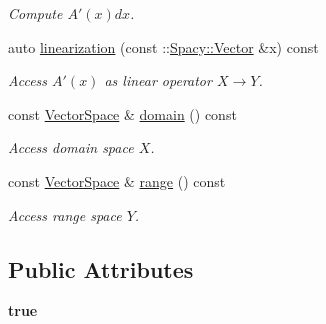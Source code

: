 \begin{DoxyCompactItemize}
\begin{DoxyCompactList}\small\item\em \-Compute $A'(x)dx$. \end{DoxyCompactList}\item 
auto \hyperlink{classSpacy_1_1dealII_1_1C1FunGOperator_3_01FunGOperator_00_01dim_00_01VariableDim_3_01variable__dims_8_8_8_4_01_4_a23e60fc5f8c950b68eaafd728dd8f118}{linearization} (const \-::\hyperlink{classSpacy_1_1Vector}{\-Spacy\-::\-Vector} \&x) const 
\begin{DoxyCompactList}\small\item\em \-Access $A'(x)$ as linear operator $X\rightarrow Y$. \end{DoxyCompactList}\item 
\hypertarget{classSpacy_1_1OperatorBase_a2588f9b3e0188820c4c494e63293dc6f}{const \hyperlink{classSpacy_1_1VectorSpace}{\-Vector\-Space} \& \hyperlink{classSpacy_1_1OperatorBase_a2588f9b3e0188820c4c494e63293dc6f}{domain} () const }\label{classSpacy_1_1OperatorBase_a2588f9b3e0188820c4c494e63293dc6f}

\begin{DoxyCompactList}\small\item\em \-Access domain space $X$. \end{DoxyCompactList}\item 
\hypertarget{classSpacy_1_1OperatorBase_ab19d3b7a6f290b1079248f1e567e53d6}{const \hyperlink{classSpacy_1_1VectorSpace}{\-Vector\-Space} \& \hyperlink{classSpacy_1_1OperatorBase_ab19d3b7a6f290b1079248f1e567e53d6}{range} () const }\label{classSpacy_1_1OperatorBase_ab19d3b7a6f290b1079248f1e567e53d6}

\begin{DoxyCompactList}\small\item\em \-Access range space $Y$. \end{DoxyCompactList}\end{DoxyCompactItemize}
\subsection*{\-Public \-Attributes}
\begin{DoxyCompactItemize}
\item 
\hypertarget{classSpacy_1_1dealII_1_1C1FunGOperator_3_01FunGOperator_00_01dim_00_01VariableDim_3_01variable__dims_8_8_8_4_01_4_a2e4adb874853cc98f96363eb28d632b3}{{\bfseries true}}\label{classSpacy_1_1dealII_1_1C1FunGOperator_3_01FunGOperator_00_01dim_00_01VariableDim_3_01variable__dims_8_8_8_4_01_4_a2e4adb874853cc98f96363eb28d632b3}

\end{DoxyCompactItemize}
